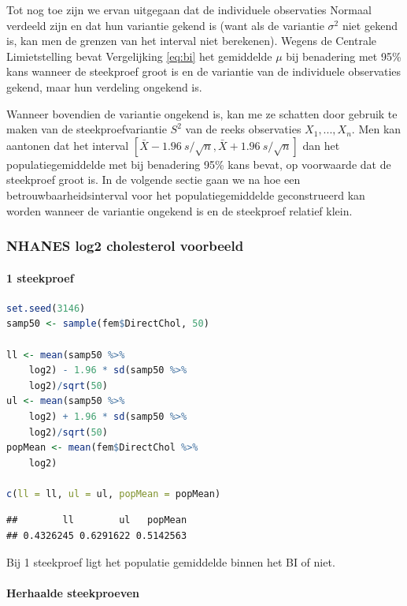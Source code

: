 \documentclass[
  12pt,dutch,coursenotes]{book}
\begin{document}
Tot nog toe zijn we ervan uitgegaan dat de individuele observaties Normaal verdeeld zijn en dat hun variantie gekend is (want als de variantie \(\sigma^2\) niet gekend is, kan men de grenzen van het interval niet berekenen).
Wegens de Centrale Limietstelling bevat Vergelijking \eqref{eq:bi} het gemiddelde \(\mu\)
bij benadering met 95\% kans wanneer de steekproef groot is en de variantie
van de individuele observaties gekend, maar hun verdeling ongekend is.

Wanneer bovendien de variantie ongekend is, kan me ze schatten door gebruik te maken van de
steekproefvariantie \(S^2\) van de reeks observaties \(X_1,...,X_n\). Men kan aantonen dat
het interval \([\bar{X} - 1.96 \ s/\sqrt{n} , \bar{X} + 1.96 \ s/\sqrt{n} ]\)
dan het populatiegemiddelde met bij benadering 95\% kans bevat, op voorwaarde
dat de steekproef groot is. In de volgende sectie gaan we na hoe een
betrouwbaarheidsinterval voor het populatiegemiddelde geconstrueerd kan
worden wanneer de variantie ongekend is en de steekproef relatief klein.

\hypertarget{nhanes-log2-cholesterol-voorbeeld}{%
\subsubsection{NHANES log2 cholesterol voorbeeld}\label{nhanes-log2-cholesterol-voorbeeld}}

\hypertarget{steekproef-1}{%
\paragraph{1 steekproef}\label{steekproef-1}}

\begin{lstlisting}[language=R]
set.seed(3146)
samp50 <- sample(fem$DirectChol, 50)

ll <- mean(samp50 %>%
    log2) - 1.96 * sd(samp50 %>%
    log2)/sqrt(50)
ul <- mean(samp50 %>%
    log2) + 1.96 * sd(samp50 %>%
    log2)/sqrt(50)
popMean <- mean(fem$DirectChol %>%
    log2)

c(ll = ll, ul = ul, popMean = popMean)
\end{lstlisting}

\begin{lstlisting}
##        ll        ul   popMean 
## 0.4326245 0.6291622 0.5142563
\end{lstlisting}

Bij 1 steekproef ligt het populatie gemiddelde binnen het BI of niet.

\hypertarget{herhaalde-steekproeven}{%
\paragraph{Herhaalde steekproeven}\label{herhaalde-steekproeven}}
\end{document}

